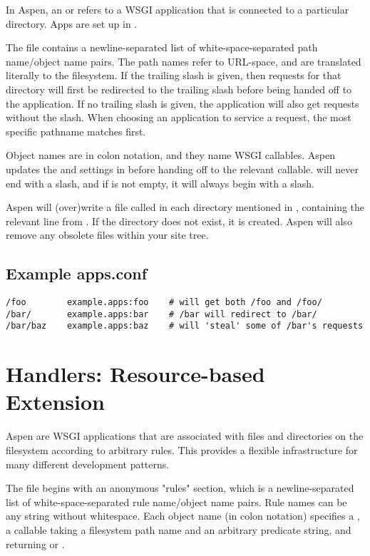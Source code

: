 In Aspen, an  or  refers to a WSGI application that is
connected to a particular directory. Apps are set up in .

The  file contains a newline-separated list of
white-space-separated path name/object name pairs. The path names refer to
URL-space, and are translated literally to the filesystem. If the trailing slash
is given, then requests for that directory will first be redirected to the
trailing slash before being handed off to the application. If no trailing slash
is given, the application will also get requests without the slash. When
choosing an application to service a request, the most specific pathname matches
first.

Object names are in colon notation, and they name WSGI callables. Aspen updates
the  and  settings in  before
handing off to the relevant callable.  will never end with a
slash, and if  is not empty, it will always begin with a slash.

Aspen will (over)write a file called  in each directory
mentioned in , containing the relevant line from
. If the directory does not exist, it is created. Aspen will
also remove any obsolete  files within your site tree.


\subsection{Example apps.conf}

\begin{verbatim}
/foo        example.apps:foo    # will get both /foo and /foo/
/bar/       example.apps:bar    # /bar will redirect to /bar/
/bar/baz    example.apps:baz    # will 'steal' some of /bar's requests
\end{verbatim}


\section{Handlers: Resource-based Extension \label{handlers}}

Aspen  are WSGI applications that are associated with files and
directories on the filesystem according to arbitrary rules. This provides a
flexible infrastructure for many different development patterns.

The  file begins with an anonymous "rules" section,
which is a newline-separated list of white-space-separated rule name/object name
pairs. Rule names can be any string without whitespace. Each object name (in
colon notation) specifies a , a callable taking a filesystem path name
and an arbitrary predicate string, and returning  or .

